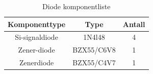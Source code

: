     \begin{table}[h]
        \centering
        \caption{Diode komponentliste}
        \label{tab:komponentliste2}
        \begin{tabular}{|c|c|c|}
            \hline
            \rowcolor[gray]{0.9}
            \textbf{Komponenttype} & \textbf{Type} & \textbf{Antall} \\ \hline
            Si-signaldiode       & 1N4l48     & 4 \\ \hline
            Zener-diode          & BZX55/C6V8      & 1 \\ \hline
            Zenerdiode           & BZX55/C4V7        & 1 \\ \hline
        \end{tabular}
    \end{table}
